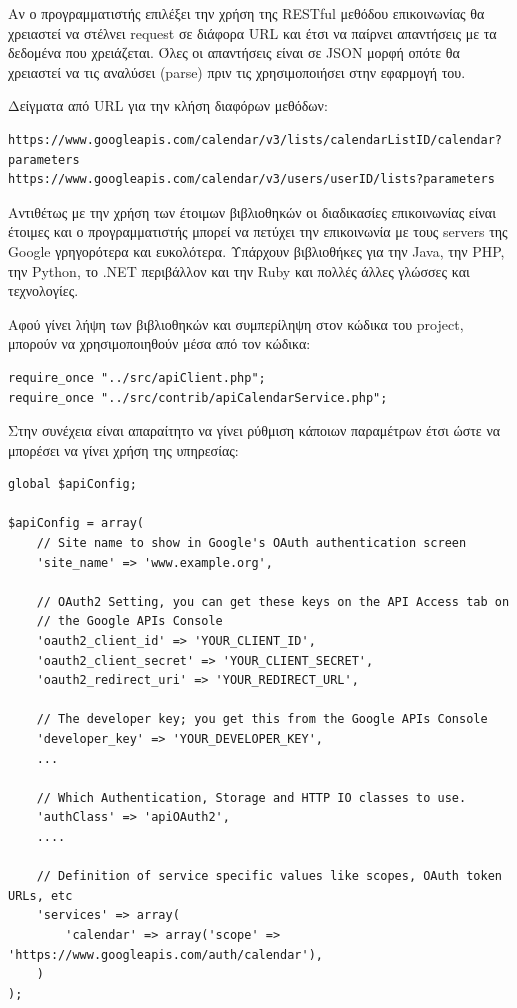 Αν ο προγραμματιστής επιλέξει την χρήση της RESTful μεθόδου επικοινωνίας θα χρειαστεί να στέλνει request σε διάφορα URL και έτσι να παίρνει απαντήσεις με τα δεδομένα που χρειάζεται. Όλες οι απαντήσεις είναι σε JSON μορφή οπότε θα χρειαστεί να τις αναλύσει (parse) πριν τις χρησιμοποιήσει στην εφαρμογή του. 

Δείγματα από URL για την κλήση διαφόρων μεθόδων: 

\begin{lstlisting}[breaklines=true]
https://www.googleapis.com/calendar/v3/lists/calendarListID/calendar?parameters
https://www.googleapis.com/calendar/v3/users/userID/lists?parameters
\end{lstlisting}

Αντιθέτως με την χρήση των έτοιμων βιβλιοθηκών οι διαδικασίες επικοινωνίας είναι έτοιμες και ο προγραμματιστής μπορεί να πετύχει την επικοινωνία με τους servers της Google γρηγορότερα και ευκολότερα. 
Υπάρχουν βιβλιοθήκες για την Java, την PHP, την Python, το .NET περιβάλλον και την Ruby και πολλές άλλες γλώσσες και τεχνολογίες. 

Αφού γίνει λήψη των βιβλιοθηκών και συμπερίληψη στον κώδικα του project, μπορούν να χρησιμοποιηθούν μέσα από τον κώδικα:

\begin{lstlisting}
require_once "../src/apiClient.php";
require_once "../src/contrib/apiCalendarService.php";
\end{lstlisting}

Στην συνέχεια είναι απαραίτητο να γίνει ρύθμιση κάποιων παραμέτρων έτσι ώστε να μπορέσει να γίνει χρήση της υπηρεσίας:

\begin{lstlisting}[breaklines=true]
global $apiConfig;

$apiConfig = array(
    // Site name to show in Google's OAuth authentication screen
    'site_name' => 'www.example.org',

    // OAuth2 Setting, you can get these keys on the API Access tab on
    // the Google APIs Console
    'oauth2_client_id' => 'YOUR_CLIENT_ID',
    'oauth2_client_secret' => 'YOUR_CLIENT_SECRET',
    'oauth2_redirect_uri' => 'YOUR_REDIRECT_URL',

    // The developer key; you get this from the Google APIs Console
    'developer_key' => 'YOUR_DEVELOPER_KEY',
    ...

    // Which Authentication, Storage and HTTP IO classes to use.
    'authClass' => 'apiOAuth2',
    ....

    // Definition of service specific values like scopes, OAuth token URLs, etc
    'services' => array(
        'calendar' => array('scope' => 'https://www.googleapis.com/auth/calendar'),
    )
);
\end{lstlisting}

